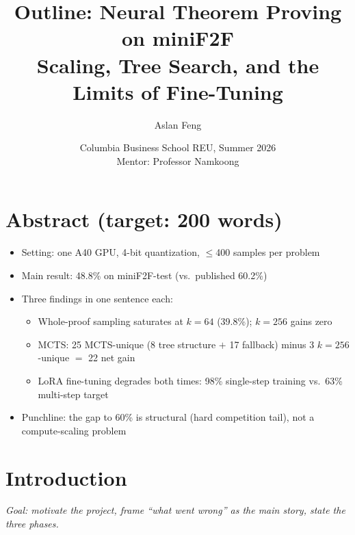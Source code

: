 \documentclass[openany, amssymb, psamsfonts]{amsart}
\title{Outline: Neural Theorem Proving on miniF2F \\
{\normalsize Scaling, Tree Search, and the Limits of Fine-Tuning}}
\author{Aslan Feng}
\date{Columbia Business School REU, Summer 2026 \\
Mentor: Professor Namkoong}
\begin{document}
\maketitle

\tableofcontents

\section*{Abstract (target: 200 words)}
\begin{itemize}
  \item Setting: one A40 GPU, 4-bit quantization, $\leq$400 samples per problem
  \item Main result: 48.8\% on miniF2F-test (vs.\ published 60.2\%)
  \item Three findings in one sentence each:
  \begin{itemize}
    \item Whole-proof sampling saturates at $k=64$ (39.8\%); $k=256$ gains zero
    \item MCTS: 25 MCTS-unique (8 tree structure $+$ 17 fallback) minus 3 $k=256$-unique $=$ 22 net gain
    \item LoRA fine-tuning degrades both times: 98\% single-step training vs.\ 63\% multi-step target
  \end{itemize}
  \item Punchline: the gap to 60\% is structural (hard competition tail), not a compute-scaling problem
\end{itemize}

\section{Introduction}

\textit{Goal: motivate the project, frame ``what went wrong'' as the main story, state the three phases.}
\end{document}
